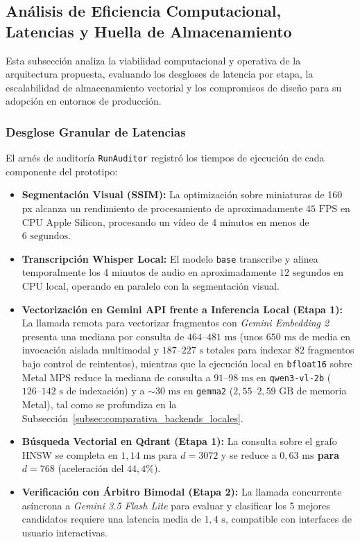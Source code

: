 \subsection{Análisis de Eficiencia Computacional, Latencias y Huella de Almacenamiento}
\label{subsec:eficiencia_computacional_costes}

Esta subsección analiza la viabilidad computacional y operativa de la arquitectura propuesta, evaluando los desgloses de latencia por etapa, la escalabilidad de almacenamiento vectorial y los compromisos de diseño para su adopción en entornos de producción.

\subsubsection{Desglose Granular de Latencias}
El arnés de auditoría \texttt{RunAuditor} registró los tiempos de ejecución de cada componente del prototipo:
\begin{itemize}
    \item \textbf{Segmentación Visual (SSIM):} La optimización sobre miniaturas de 160 px alcanza un rendimiento de procesamiento de aproximadamente $45\text{ FPS}$ en CPU Apple Silicon, procesando un vídeo de 4 minutos en menos de $6\text{ segundos}$.
    \item \textbf{Transcripción Whisper Local:} El modelo \texttt{base} transcribe y alinea temporalmente los 4 minutos de audio en aproximadamente $12\text{ segundos}$ en CPU local, operando en paralelo con la segmentación visual.
    \item \textbf{Vectorización en Gemini API frente a Inferencia Local (Etapa 1):} La llamada remota para vectorizar fragmentos con \textit{Gemini Embedding 2} presenta una mediana por consulta de $464\text{--}481\text{ ms}$ (unos $650\text{ ms}$ de media en invocación aislada multimodal y $187\text{--}227\text{ s}$ totales para indexar $82$ fragmentos bajo control de reintentos), mientras que la ejecución local en \texttt{bfloat16} sobre Metal MPS reduce la mediana de consulta a $91\text{--}98\text{ ms}$ en \texttt{qwen3-vl-2b} ($126\text{--}142\text{ s}$ de indexación) y a $\sim 30\text{ ms}$ en \texttt{gemma2} ($2,55\text{--}2,59\text{ GB}$ de memoria Metal), tal como se profundiza en la Subsección~\ref{subsec:comparativa_backends_locales}.
    \item \textbf{Búsqueda Vectorial en Qdrant (Etapa 1):} La consulta sobre el grafo HNSW se completa en $1,14\text{ ms}$ para $d=3072$ y se reduce a \textbf{$0,63\text{ ms}$ para $d=768$} (aceleración del $44,4\%$).
    \item \textbf{Verificación con Árbitro Bimodal (Etapa 2):} La llamada concurrente asíncrona a \textit{Gemini 3.5 Flash Lite} para evaluar y clasificar los 5 mejores candidatos requiere una latencia media de $1,4\text{ s}$, compatible con interfaces de usuario interactivas.
\end{itemize}

